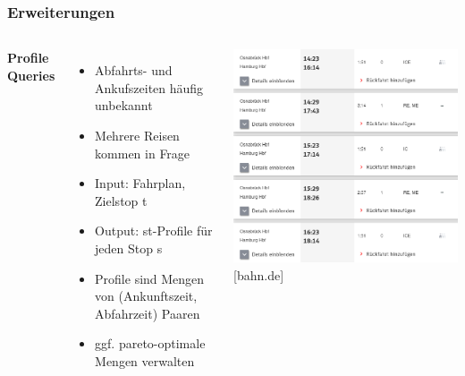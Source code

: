 \documentclass[aspectratio=169]{beamer}
\begin{document}
\begin{frame}
\frametitle{Erweiterungen}
\begin{columns}[c] %
	
	\textbf{Profile Queries}
	\begin{itemize}
		\item Abfahrts- und Ankufszeiten häufig unbekannt
		\item Mehrere Reisen kommen in Frage
		\item Input: Fahrplan, Zielstop t
		\item Output: st-Profile für jeden Stop s
		\item Profile sind Mengen von (Ankunftszeit, Abfahrzeit) Paaren
		\item ggf. pareto-optimale Mengen verwalten
	\end{itemize}
	\includegraphics[scale=0.25]{profiles.png}
	\centering
	\tiny [bahn.de]
	
\end{columns}
\end{frame}

\end{document}
